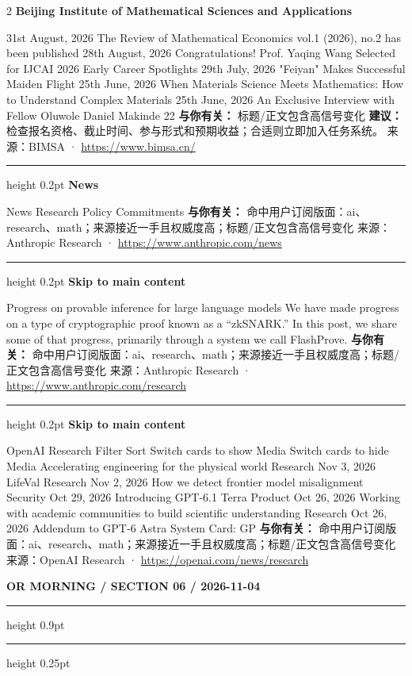 \documentclass[10.5pt]{ctexart}
\begin{document}
\begin{multicols}{2}
{\large\bfseries Beijing Institute of Mathematical Sciences and Applications}\par
31st August, 2026 The Review of Mathematical Economics vol.1 (2026), no.2 has been published 28th August, 2026 Congratulations! Prof. Yaqing Wang Selected for IJCAI 2026 Early Career Spotlights 29th July, 2026 "Feiyan" Makes Successful Maiden Flight 25th June, 2026 When Materials Science Meets Mathematics: How to Understand Complex Materials 25th June, 2026 An Exclusive Interview with Fellow Oluwole Daniel Makinde 22
\textbf{与你有关：} 标题/正文包含高信号变化
\textbf{建议：} 检查报名资格、截止时间、参与形式和预期收益；合适则立即加入任务系统。
{\footnotesize\color{ormuted} 来源：BIMSA · \url{https://www.bimsa.cn/}}
\vspace{2mm}
\hrule height 0.2pt
\vspace{2mm}
{\large\bfseries News}\par
News Research Policy Commitments
\textbf{与你有关：} 命中用户订阅版面：ai、research、math；来源接近一手且权威度高；标题/正文包含高信号变化
{\footnotesize\color{ormuted} 来源：Anthropic Research · \url{https://www.anthropic.com/news}}
\vspace{2mm}
\hrule height 0.2pt
\vspace{2mm}
{\large\bfseries Skip to main content}\par
Progress on provable inference for large language models We have made progress on a type of cryptographic proof known as a “zkSNARK.” In this post, we share some of that progress, primarily through a system we call FlashProve.
\textbf{与你有关：} 命中用户订阅版面：ai、research、math；来源接近一手且权威度高；标题/正文包含高信号变化
{\footnotesize\color{ormuted} 来源：Anthropic Research · \url{https://www.anthropic.com/research}}
\vspace{2mm}
\hrule height 0.2pt
\vspace{2mm}
{\large\bfseries Skip to main content}\par
OpenAI Research Filter Sort Switch cards to show Media Switch cards to hide Media Accelerating engineering for the physical world Research Nov 3, 2026 LifeVal Research Nov 2, 2026 How we detect frontier model misalignment Security Oct 29, 2026 Introducing GPT-6.1 Terra Product Oct 26, 2026 Working with academic communities to build scientific understanding Research Oct 26, 2026 Addendum to GPT‑6 Astra System Card: GP
\textbf{与你有关：} 命中用户订阅版面：ai、research、math；来源接近一手且权威度高；标题/正文包含高信号变化
{\footnotesize\color{ormuted} 来源：OpenAI Research · \url{https://openai.com/news/research}}
\end{multicols}
\newpage
{\small\bfseries OR MORNING / SECTION 06 / 2026-11-04}
\vspace{2mm}
\hrule height 0.9pt
\vspace{1.5mm}
\hrule height 0.25pt
\vspace{4mm}
\end{document}
